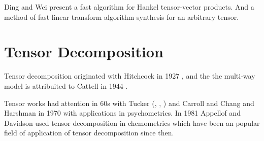 \documentclass[letterpaper,12pt]{article}
\begin{document}








Ding and Wei \cite{Ding2015} present a fast algorithm for Hankel tensor-vector products. And \cite{Dourbal2016} a method of fast linear transform algorithm synthesis for an arbitrary tensor.

\section{Tensor Decomposition}


Tensor decomposition originated with Hitchcock in 1927 \cite{Hitchcock1927}, and the the multi-way model is attribuited to Cattell in 1944 \cite{Cattell1944}.

Tensor works had attention in 60s with Tucker (\cite{Tucker1963}, \cite{Tucker1964}, \cite{Tucker1966}) and Carroll and Chang \cite{Carroll1970} and Harshman in 1970 \cite{Harshman1970} with applications in psychometrics. In 1981 Appellof and Davidson \cite{Appellof1981} used tensor decomposition in chemometrics which have been an popular field of application of tensor decomposition since then.
\end{document}
